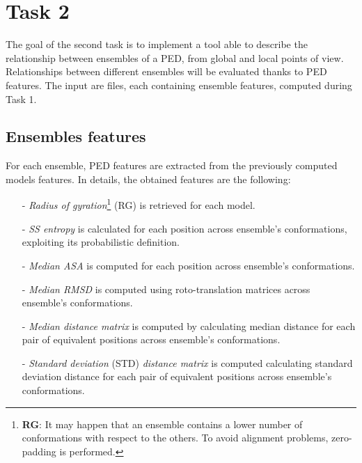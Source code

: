 \section{Task 2}\label{sec:task2}

The goal of the second task is to implement a tool able to describe the relationship between ensembles of a PED, from global and local points of view. Relationships between different ensembles will be evaluated thanks to PED features. The input are files, each containing ensemble features, computed during Task 1.

\subsection{Ensembles features}
For each ensemble, PED features are extracted from the previously computed models features. In details, the obtained features are the following:

\begin{itemize}
\item[-] \emph{Radius of gyration}\footnote{\textbf{RG}: It may happen that an ensemble contains a lower number of conformations with respect to the others. To avoid alignment problems, zero-padding is performed.} (RG) is retrieved for each model.
\item[-] \emph{SS entropy} is calculated for each position across ensemble's conformations, exploiting its probabilistic definition.
\item[-] \emph{Median ASA} is computed for each position across ensemble's conformations.
\item[-] \emph{Median RMSD} is computed using roto-translation matrices across ensemble's conformations.
\item[-] \emph{Median distance matrix} is computed by calculating median distance for each pair of equivalent positions across ensemble's conformations.
\item[-] \emph{Standard deviation} (STD) \emph{distance matrix} is computed calculating standard deviation distance for each pair of equivalent positions across ensemble's conformations.
\end{itemize}

